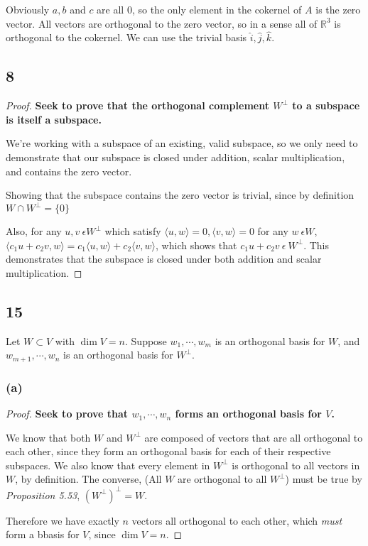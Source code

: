 \documentclass[10pt,letterpaper]{article}
\newcommand{\R}{\mathbb{R}}
\begin{document}
	Obviously $a, b$ and $c$ are all 0, so the only element in the cokernel of $A$ is the zero vector. All vectors are orthogonal to the zero vector, so in a sense all of $\R^3$ is orthogonal to the cokernel. We can use the trivial basis $\hat{i}, \hat{j}, \hat{k}$. 
	
	\subsection*{8}
	\begin{proof}
		\textbf{Seek to prove that the orthogonal complement $W^\perp$ to a subspace is itself a subspace.}
		
		We're working with a subspace of an existing, valid subspace, so we only need to demonstrate that our subspace is closed under addition, scalar multiplication, and contains the zero vector. 
		
		Showing that the subspace contains the zero vector is trivial, since by definition $W \cap W^\perp = \{0\}$
		
		Also, for any $u,v \: \epsilon W^\perp$ which satisfy $\langle u, w\rangle = 0, \langle v, w\rangle = 0 $ for any $w \: \epsilon W$, $\langle c_1u + c_2v,w \rangle = c_1 \langle u,w \rangle + c_2 \langle v,w \rangle $, which shows that $c_1u + c_2v \: \epsilon \: W^\perp$.  This demonstrates that the subspace is closed under both addition and scalar multiplication. 
	\end{proof}
	\subsection*{15} Let $W \subset V$ with $\dim V = n$.  Suppose $w_1, \cdots, w_m$ is an orthogonal basis for $W$, and $w_{m+1},\cdots,w_n$ is an orthogonal basis for $W^\perp$.
	\subsubsection*{(a)} \begin{proof}
		\textbf{Seek to prove that $w_1,\cdots,w_n$ forms an orthogonal basis for $V$.}
		
		We know that both $W$ and $W^\perp$ are composed of vectors that are all orthogonal to each other, since they form an orthogonal basis for each of their respective subspaces. We also know that every element in $W^\perp$ is orthogonal to all vectors in $W$, by definition. The converse, (All $W$ are orthogonal to all $W^\perp$) must be true by \textit{Proposition 5.53}, $(W^\perp)^\perp = W.$
		
		Therefore we have exactly $n$ vectors all orthogonal to each other, which \textit{must} form a bbasis for $V$, since $\dim V = n$. 
	\end{proof}
\end{document}

